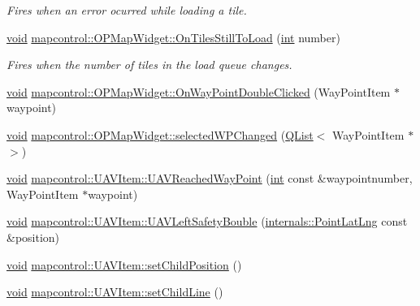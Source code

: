 \begin{DoxyCompactItemize}
\begin{DoxyCompactList}\small\item\em Fires when an error ocurred while loading a tile. \end{DoxyCompactList}\item 
\hyperlink{group___u_a_v_objects_plugin_ga444cf2ff3f0ecbe028adce838d373f5c}{void} \hyperlink{group___o_p_map_widget_gad7537ed2e10658cabe5f1f320f31b83f}{mapcontrol\-::\-O\-P\-Map\-Widget\-::\-On\-Tiles\-Still\-To\-Load} (\hyperlink{ioapi_8h_a787fa3cf048117ba7123753c1e74fcd6}{int} number)
\begin{DoxyCompactList}\small\item\em Fires when the number of tiles in the load queue changes. \end{DoxyCompactList}\item 
\hyperlink{group___u_a_v_objects_plugin_ga444cf2ff3f0ecbe028adce838d373f5c}{void} \hyperlink{group___o_p_map_widget_ga76257e275a9d3c05a75b0fca87faba3d}{mapcontrol\-::\-O\-P\-Map\-Widget\-::\-On\-Way\-Point\-Double\-Clicked} (Way\-Point\-Item $\ast$waypoint)
\item 
\hyperlink{group___u_a_v_objects_plugin_ga444cf2ff3f0ecbe028adce838d373f5c}{void} \hyperlink{group___o_p_map_widget_ga173f22c1dd41ac235400d05eb42eeff6}{mapcontrol\-::\-O\-P\-Map\-Widget\-::selected\-W\-P\-Changed} (\hyperlink{class_q_list}{Q\-List}$<$ Way\-Point\-Item $\ast$ $>$)
\item 
\hyperlink{group___u_a_v_objects_plugin_ga444cf2ff3f0ecbe028adce838d373f5c}{void} \hyperlink{group___o_p_map_widget_gabf2d7a7d3651230d841d2d0e2477bcad}{mapcontrol\-::\-U\-A\-V\-Item\-::\-U\-A\-V\-Reached\-Way\-Point} (\hyperlink{ioapi_8h_a787fa3cf048117ba7123753c1e74fcd6}{int} const \&waypointnumber, Way\-Point\-Item $\ast$waypoint)
\item 
\hyperlink{group___u_a_v_objects_plugin_ga444cf2ff3f0ecbe028adce838d373f5c}{void} \hyperlink{group___o_p_map_widget_ga845584d53f92c89f8f657d7d13630187}{mapcontrol\-::\-U\-A\-V\-Item\-::\-U\-A\-V\-Left\-Safety\-Bouble} (\hyperlink{structinternals_1_1_point_lat_lng}{internals\-::\-Point\-Lat\-Lng} const \&position)
\item 
\hyperlink{group___u_a_v_objects_plugin_ga444cf2ff3f0ecbe028adce838d373f5c}{void} \hyperlink{group___o_p_map_widget_ga68e3f8435620e746ad771a99666216dc}{mapcontrol\-::\-U\-A\-V\-Item\-::set\-Child\-Position} ()
\item 
\hyperlink{group___u_a_v_objects_plugin_ga444cf2ff3f0ecbe028adce838d373f5c}{void} \hyperlink{group___o_p_map_widget_gafcbd9466c92579c43c5be53eaca75147}{mapcontrol\-::\-U\-A\-V\-Item\-::set\-Child\-Line} ()

\end{DoxyCompactItemize}
